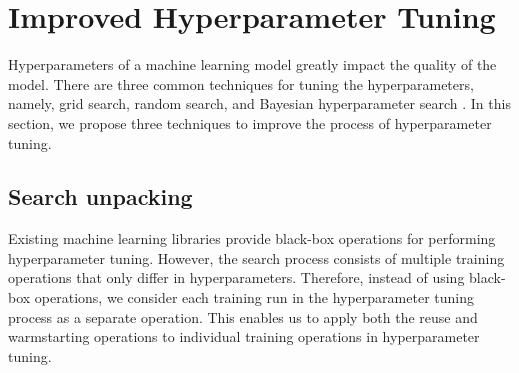 \section{Improved Hyperparameter Tuning} \label{sec-hyperparam-optimization}
Hyperparameters of a machine learning model greatly impact the quality of the model.
There are three common techniques for tuning the hyperparameters, namely, grid search, random search, and Bayesian hyperparameter search \cite{hutter2011sequential,snoek2012practical}.
In this section, we propose three techniques to improve the process of hyperparameter tuning.

\subsection{Search unpacking}
Existing machine learning libraries provide black-box operations for performing hyperparameter tuning.
However, the search process consists of multiple training operations that only differ in hyperparameters.
Therefore, instead of using black-box operations, we consider each training run in the hyperparameter tuning process as a separate operation.
This enables us to apply both the reuse and warmstarting operations to individual training operations in hyperparameter tuning.

